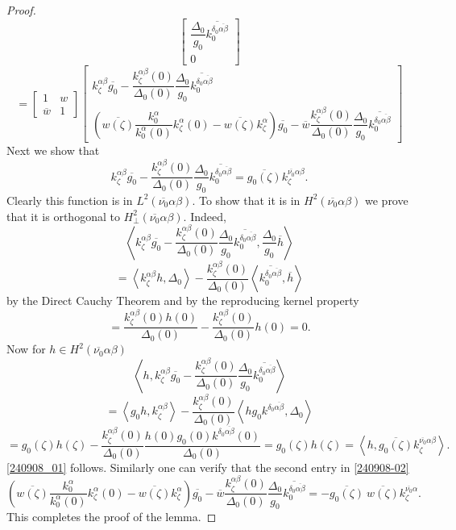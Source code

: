 \documentclass[10pt,a4paper]{amsart}
\def\D{\Delta}
\def\a{\alpha}
\def\b{\beta}
\def\be{\begin{equation}}
\def\d{\delta}
\def\ee{\end{equation}}
\newcommand{\z}{\zeta}
\begin{document}
\begin{proof}
$$\begin{bmatrix}
\dfrac{\D_0}{g_0}\overline{k^{\d_0\overline{\alpha\b}}_0}
\\
0
\end{bmatrix}
$$
\be\label{240908-02}
=
\left[\begin{array}{cc} 1& w \\
\overline{w} & 1\end{array}\right]\left[\begin{array}{c}
k^{\alpha\beta}_\zeta\overline{g_0}
-
\dfrac{k^{\alpha\beta}_\zeta (0)}{\D_0(0)}
\dfrac{\D_0}{g_0}\overline{k^{\d_0\overline{\alpha\b}}_0}
 \\
\left(
\overline{w(\zeta)} \dfrac{k^\a_0}{k^\a_0(0)}k^\alpha_\zeta(0)-\overline{w(\zeta)} k^\alpha_\zeta
\right)
\overline{g_0}
-\overline w
\dfrac{k^{\alpha\beta}_\zeta (0)}{\D_0(0)}
\dfrac{\D_0}{g_0}\overline{k^{\d_0\overline{\alpha\b}}_0}
\end{array}\right]
\ee
Next we show that
\be\label{240908_01}
k^{\alpha\beta}_\zeta\overline{g_0}
-
\dfrac{k^{\alpha\beta}_\zeta (0)}{\D_0(0)}
\dfrac{\D_0}{g_0}\overline{k^{\d_0\overline{\alpha\b}}_0}
=\overline{g_0(\z)}k^{\overline{\nu_0}\alpha\beta}_\zeta .
\ee
Clearly this function is in $L^2(\overline{\nu_0}\alpha\beta)$. To show that it is in
$H^2(\overline{\nu_0}\alpha\beta)$ we prove that it is orthogonal to
$H^2_\perp(\overline{\nu_0}\alpha\beta)$. Indeed,
$$
\left\langle
k^{\alpha\beta}_\zeta\overline{g_0}
-
\dfrac{k^{\alpha\beta}_\zeta (0)}{\D_0(0)}
\dfrac{\D_0}{g_0}\overline{k^{\d_0\overline{\alpha\b}}_0}
,
\dfrac{\D_0}{g_0}\overline h
\right\rangle
$$
$$
=
\left\langle
k^{\alpha\beta}_\zeta h
,
\D_0
\right\rangle
-
\dfrac{k^{\alpha\beta}_\zeta (0)}{\D_0(0)}
\left\langle
\overline{k^{\d_0\overline{\alpha\b}}_0}
,
\overline h
\right\rangle
$$
by the Direct Cauchy Theorem and by the reproducing kernel property
$$
=
\dfrac
{k^{\alpha\beta}_\zeta(0) h(0)}
{\D_0(0)}
-
\dfrac{k^{\alpha\beta}_\zeta (0)}{\D_0(0)}
h(0)
=0.
$$
Now for $h\in H^2(\overline{\nu_0}\alpha\beta)$
$$
\left\langle
h,
k^{\alpha\beta}_\zeta\overline{g_0}
-
\dfrac{k^{\alpha\beta}_\zeta (0)}{\D_0(0)}
\dfrac{\D_0}{g_0}\overline{k^{\d_0\overline{\alpha\b}}_0}
\right\rangle
$$
$$
=
\left\langle
g_0 h,
k^{\alpha\beta}_\zeta
\right\rangle
-
\dfrac{k^{\alpha\beta}_\zeta (0)}{\D_0(0)}
\left\langle
h g_0 k^{\d_0\overline{\alpha\b}},
\D_0
\right\rangle
$$
$$
=
g_0(\z) h(\z)
-
\dfrac{k^{\alpha\beta}_\zeta (0)}{\D_0(0)}
\dfrac
{h(0) g_0(0) k^{\d_0\overline{\alpha\b}}(0)}
{\D_0(0)}
=
g_0(\z) h(\z)
=\left\langle h, \overline{g_0(\z)}k^{\overline{\nu_0}\alpha\beta}_\zeta\right\rangle .
$$
\eqref{240908_01} follows. Similarly one can verify that the second entry in \eqref{240908-02}
$$
\left(
\overline{w(\zeta)} \dfrac{k^\a_0}{k^\a_0(0)}k^\alpha_\zeta(0)-\overline{w(\zeta)} k^\alpha_\zeta
\right)
\overline{g_0}
-\overline w
\dfrac{k^{\alpha\beta}_\zeta (0)}{\D_0(0)}
\dfrac{\D_0}{g_0}\overline{k^{\d_0\overline{\alpha\b}}_0}
=
-\overline{g_0(\z)}\ \overline{w(\z)}k^{\overline{\nu_0}\alpha}_\zeta.
$$
This completes the proof of the lemma.
\end{proof}
\end{document}
